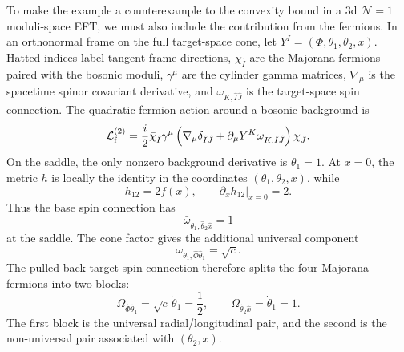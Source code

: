 \documentclass[a4paper,11pt]{article}
\begin{document}
To make the example a counterexample to the convexity bound in a 3d $\mathcal N=1$ moduli-space EFT, we must also include the contribution from the fermions. In an orthonormal frame on the full target-space cone, let $Y^I=(\Phi,\theta_1,\theta_2,x)$. Hatted indices label tangent-frame directions, $\chi_{\hat I}$ are the Majorana fermions paired with the bosonic moduli, $\gamma^\mu$ are the cylinder gamma matrices, $\nabla_\mu$ is the spacetime spinor covariant derivative, and $\omega_{K,\hat I\hat J}$ is the target-space spin connection. The quadratic fermion action around a bosonic background is
\begin{equation}
    \mathcal L_{\rm f}^{(2)}
    =
    \frac{i}{2}
    \bar\chi_{\hat I}\gamma^\mu
    \left(
    \nabla_\mu\delta_{\hat I\hat J}
    +
    \partial_\mu Y^K\omega_{K,\hat I\hat J}
    \right)
    \chi_{\hat J}.
\end{equation}
On the saddle, the only nonzero background derivative is $\dot\theta_1=1$. At $x=0$, the metric $h$ is locally the identity in the coordinates $(\theta_1,\theta_2,x)$, while
\begin{equation}
  h_{12}=2f(x), \qquad \partial_x h_{12}\big|_{x=0}=2 .
\end{equation}
Thus the base spin connection has
\begin{equation}
  \bar\omega_{\theta_1,\hat\theta_2\hat x}=1
\end{equation}
at the saddle. The cone factor gives the additional universal component
\begin{equation}
  \omega_{\theta_1,\hat\Phi\hat\theta_1}=\sqrt c .
\end{equation}
The pulled-back target spin connection therefore splits the four Majorana fermions into two blocks:
\begin{equation}
    \Omega_{\hat\Phi\hat\theta_1}
    =
    \sqrt c\,\dot\theta_1
    =
    \frac{1}{2},
    \qquad
    \Omega_{\hat\theta_2\hat x}
    =
    \dot\theta_1
    =
    1 .
\end{equation}
The first block is the universal radial/longitudinal pair, and the second is the non-universal pair associated with $(\theta_2,x)$.
\end{document}
